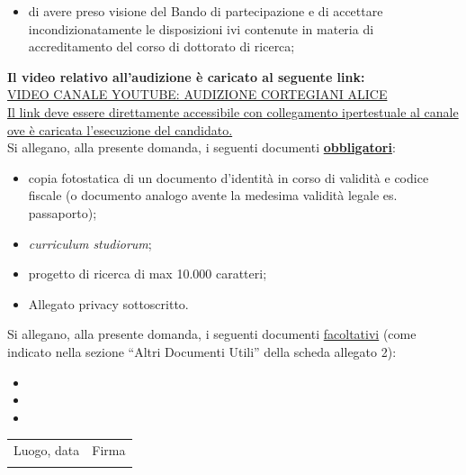 \documentclass[a4paper,12pt]{article}
\newcommand{\linefill}[1]{\makebox[#1]{\hrulefill}}
\newcommand{\longline}{\linefill{8cm}}
\newcommand{\fullline}{\linefill{\textwidth}}
\begin{document}
\begin{flushleft}
\begin{itemize}[leftmargin=0.5cm, itemsep=0.3cm, resume]
\item di avere preso visione del Bando di partecipazione e di accettare incondizionatamente le disposizioni ivi contenute in materia di accreditamento del corso di dottorato di ricerca;

\end{itemize}

\vspace{0.8cm}
\textbf{Il video relativo all'audizione è caricato al seguente link:}\\[0.5cm]
\href{https://youtu.be/lQG6IzOIsMU}{VIDEO CANALE YOUTUBE: AUDIZIONE CORTEGIANI ALICE}
\fullline{}\\[0.5cm]

\uline{Il link deve essere direttamente accessibile con collegamento ipertestuale al canale ove è caricata l'esecuzione del candidato.}\\[1cm]

Si allegano, alla presente domanda, i seguenti documenti \textbf{\uline{obbligatori}}:

\begin{itemize}[leftmargin=0.5cm, itemsep=0.2cm]
\item copia fotostatica di un documento d'identità in corso di validità e codice fiscale (o documento analogo avente la medesima validità legale es. passaporto);
\item \textit{curriculum studiorum};
\item progetto di ricerca di max 10.000 caratteri;
\item Allegato privacy sottoscritto.
\end{itemize}

\vspace{0.8cm}
Si allegano, alla presente domanda, i seguenti documenti \uline{facoltativi} (come indicato nella sezione ``Altri Documenti Utili'' della scheda allegato 2):

\begin{itemize}[leftmargin=0.5cm, itemsep=0.3cm]
\item \longline{}
\item \longline{}
\item \longline{}
\end{itemize}

\vfill

\begin{tabular}{p{}p{}}
Luogo, data & Firma \\[1cm]
\longline{} & \longline{} \\
\end{tabular}

\end{flushleft}
\end{document}
